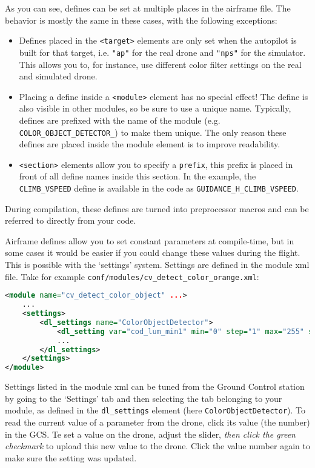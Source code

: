 \documentclass{article}
\begin{document}
As you can see, defines can be set at multiple places in the airframe file. The behavior is mostly the same in these cases, with the following exceptions:
\begin{itemize}
\item Defines placed in the \texttt{<target>} elements are only set when the autopilot is built for that target, i.e. \texttt{"ap"} for the real drone and \texttt{"nps"} for the simulator. This allows you to, for instance, use different color filter settings on the real and simulated drone.
\item Placing a define inside a \texttt{<module>} element has no special effect! The define is also visible in other modules, so be sure to use a unique name. Typically, defines are prefixed with the name of the module (e.g. \texttt{COLOR\_OBJECT\_DETECTOR\_}) to make them unique. The only reason these defines are placed inside the module element is to improve readability.
\item \texttt{<section>} elements allow you to specify a \texttt{prefix}, this prefix is placed in front of all define names inside this section. In the example, the \texttt{CLIMB\_VSPEED} define is available in the code as \texttt{GUIDANCE\_H\_CLIMB\_VSPEED}.
\end{itemize}
During compilation, these defines are turned into preprocessor macros and can be referred to directly from your code.


Airframe defines allow you to set constant parameters at compile-time, but in some cases it would be easier if you could change these values during the flight. This is possible with the `settings' system. Settings are defined in the module xml file. Take for example \texttt{conf/modules/cv\_detect\_color\_orange.xml}:
\begin{lstlisting}[language=xml]
<module name="cv_detect_color_object" ...>
	...
	<settings>
		<dl_settings name="ColorObjectDetector">
			<dl_setting var="cod_lum_min1" min="0" step="1" max="255" shortname="y_min1"/>
			...
		</dl_settings>
	</settings>
</module>
\end{lstlisting}
Settings listed in the module xml can be tuned from the Ground Control station by going to the `Settings' tab and then selecting the tab belonging to your module, as defined in the \texttt{dl\_settings} element (here \texttt{ColorObjectDetector}). To read the current value of a parameter from the drone, click its value (the number) in the GCS. Te set a value on the drone, adjust the slider, \emph{then click the green checkmark} to upload this new value to the drone. Click the value number again to make sure the setting was updated.
\end{document}
